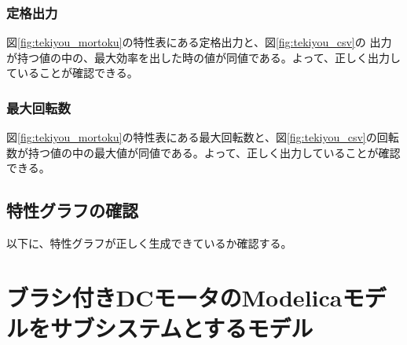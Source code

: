 \subsubsection{定格出力}
図\ref{fig:tekiyou_mortoku}の特性表にある定格出力と、図\ref{fig:tekiyou_csv}の
出力が持つ値の中の、最大効率を出した時の値が同値である。よって、正しく出力していることが確認できる。
\subsubsection{最大回転数}
図\ref{fig:tekiyou_mortoku}の特性表にある最大回転数と、図\ref{fig:tekiyou_csv}の回転数が持つ値の中の最大値が同値である。よって、正しく出力していることが確認できる。
\subsection{特性グラフの確認}
以下に、特性グラフが正しく生成できているか確認する。

\section{ブラシ付きDCモータのModelicaモデルをサブシステムとするモデル}
